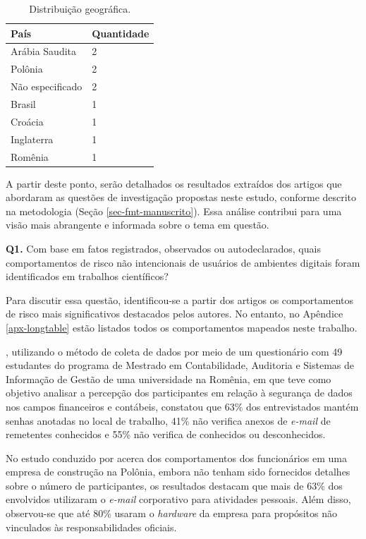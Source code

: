\documentclass[portuguese]{textolivre}
\begin{document}
\begin{table}[htbp]
\centering
\begin{threeparttable}
\caption{Distribuição geográfica.}
\label{tab03}
\begin{tabular}{ll}
\toprule
País & Quantidade \\
\midrule
Arábia Saudita & 2 \\
Polônia & 2 \\
Não especificado & 2 \\
Brasil & 1 \\
Croácia & 1 \\
Inglaterra & 1 \\
Romênia & 1 \\
\midrule
\end{tabular}
\end{threeparttable}
\end{table}

A partir deste ponto, serão detalhados os resultados extraídos dos artigos que abordaram as questões de investigação propostas neste estudo, conforme descrito na metodologia (Seção \ref{sec-fmt-manuscrito}). Essa análise contribui para uma visão mais abrangente e informada sobre o tema em questão.

\textbf{Q1.} Com base em fatos registrados, observados ou autodeclarados, quais comportamentos de risco não intencionais de usuários de ambientes digitais foram identificados em trabalhos científicos?

Para discutir essa questão, identificou-se a partir dos artigos os comportamentos de risco mais significativos destacados pelos autores. No entanto, no Apêndice \ref{apx-longtable} estão listados todos os comportamentos mapeados neste trabalho.

\textcite{rindasu_information_2018}, utilizando o método de coleta de dados por meio de um questionário com 49 estudantes do programa de Mestrado em Contabilidade, Auditoria e Sistemas de Informação de Gestão de uma universidade na Romênia, em que teve como objetivo analisar a percepção dos participantes em relação à segurança de dados nos campos financeiros e contábeis, constatou que 63\% dos entrevistados mantém senhas anotadas no local de trabalho, 41\% não verifica anexos de \textit{e-mail} de remetentes conhecidos e 55\% não verifica de conhecidos ou desconhecidos.

No estudo conduzido por \textcite{palega_threats_2018} acerca dos comportamentos dos funcionários em uma empresa de construção na Polônia, embora não tenham sido fornecidos detalhes sobre o número de participantes, os resultados destacam que mais de 63\% dos envolvidos utilizaram o \textit{e-mail} corporativo para atividades pessoais. Além disso, observou-se que até 80\% usaram o \textit{hardware} da empresa para propósitos não vinculados às responsabilidades oficiais.
\end{document}
